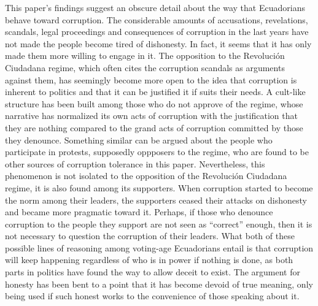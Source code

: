 \documentclass[floatsintext,man]{apa7}\usepackage[]{graphicx}\usepackage[]{color}
\begin{document}
This paper's findings suggest an obscure detail about the way that Ecuadorians behave toward corruption. The considerable amounts of accusations, revelations, scandals, legal proceedings and consequences of corruption in the last years have not made the people become tired of dishonesty. In fact, it seems that it has only made them more willing to engage in it. The opposition to the Revolución Ciudadana regime, which often cites the corruption scandals as arguments against them, has seemingly become more open to the idea that corruption is inherent to politics and that it can be justified it if suits their needs. A cult-like structure has been built among those who do not approve of the regime, whose narrative has normalized its own acts of corruption with the justification that they are nothing compared to the grand acts of corruption committed by those they denounce. Something similar can be argued about the people who participate in protests, supposedly oppposers to the regime, who are found to be other sources of corruption tolerance in this paper. Nevertheless, this phenomenon is not isolated to the opposition of the Revolución Ciudadana regime, it is also found among its supporters. When corruption started to become the norm among their leaders, the supporters ceased their attacks on dishonesty and became more pragmatic toward it. Perhaps, if those who denounce corruption to the people they support are not seen as \enquote{correct} enough, then it is not necessary to question the corruption of their leaders. What both of these possible lines of reasoning among voting-age Ecuadorians entail is that corruption will keep happening regardless of who is in power if nothing is done, as both parts in politics have found the way to allow deceit to exist. The argument for honesty has been bent to a point that it has become devoid of true meaning, only being used if such honest works to the convenience of those speaking about it. 
\end{document}
